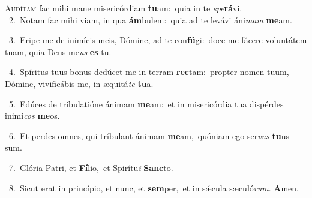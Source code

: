 \lettrine{\initial\textcolor{\initialcolor}{A}}{udítam} fac mihi mane misericórdiam \textbf{tu}\-am:~\star quia in te \textit{spe}\-\textbf{rá}vi.\\
{\numbfont\textcolor{\numbcolor}{~2.}}~Notam fac mihi viam, in qua \textbf{ám}\-bulem:~\star quia ad te levávi áni\textit{mam} \textbf{me}\-am.\par
{\numbfont\textcolor{\numbcolor}{~3.}}~Eripe me de inimícis meis, Dómine, ad te con\-\textbf{fú}\-gi:~\star doce me fácere voluntátem tuam, quia Deus me\textit{us} \textbf{es} tu.\par
{\numbfont\textcolor{\numbcolor}{~4.}}~Spíritus tuus bonus dedúcet me in terram \textbf{rec}\-tam:~\star propter nomen tuum, Dómine, vivificábis me, in æquitá\textit{te} \textbf{tu}\-a.\par
{\numbfont\textcolor{\numbcolor}{~5.}}~Edúces de tribulatióne ánimam \textbf{me}\-am:~\star et in misericórdia tua dispérdes inimí\textit{cos} \textbf{me}\-os.\par
{\numbfont\textcolor{\numbcolor}{~6.}}~Et perdes omnes, qui tríbulant ánimam \textbf{me}\-am,~\star quóniam ego ser\textit{vus} \textbf{tu}\-us sum.\par
{\numbfont\textcolor{\numbcolor}{~7.}}~Glória Patri, et \textbf{Fí}\-lio,~\star et Spirítu\textit{i} \textbf{Sanc}\-to.\par
{\numbfont\textcolor{\numbcolor}{~8.}}~Sicut erat in princípio, et nunc, et \textbf{sem}\-per,~\star et in sǽcula sæculó\-\textit{rum}\-. \textbf{A}\-men.\par
